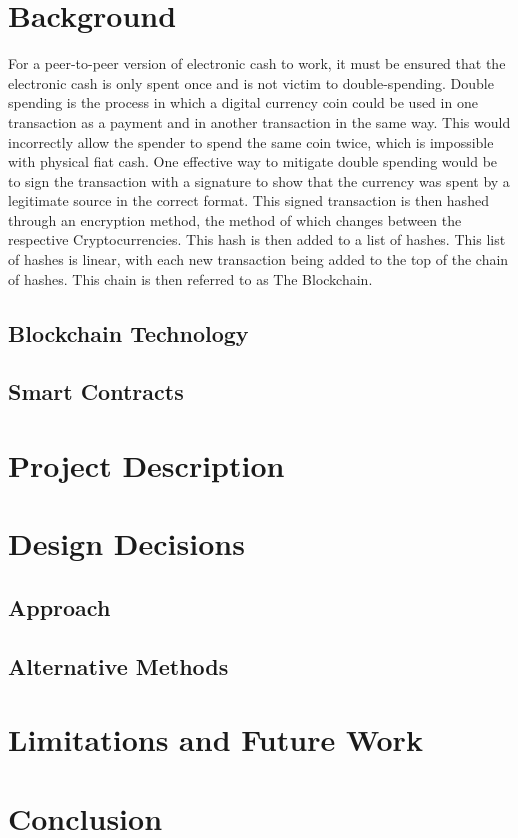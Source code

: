 \documentclass[conference]{IEEEtran}
\begin{document}
\section{Background}
For a peer-to-peer version of electronic cash to work, it must be ensured that the electronic cash is only spent once and is not victim to double-spending. Double spending is the process in which a digital currency coin could be used in one transaction as a payment and in another transaction in the same way. This would incorrectly allow the spender to spend the same coin twice, which is impossible with physical fiat cash. One effective way to mitigate double spending would be to sign the transaction with a signature to show that the currency was spent by a legitimate source in the correct format. This signed transaction is then hashed through an encryption method, the method of which changes between the respective Cryptocurrencies. This hash is then added to a list of hashes. This list of hashes is linear, with each new transaction being added to the top of the chain of hashes. This chain is then referred to as The Blockchain.
\subsection{Blockchain Technology}
\subsection{Smart Contracts}

\section{Project Description}

\section{Design Decisions}
\subsection{Approach}
\subsection{Alternative Methods}

\section{Limitations and Future Work}

\section{Conclusion}
\end{document}
